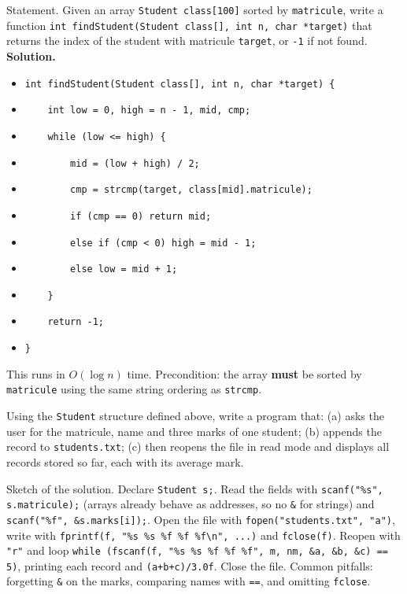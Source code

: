 \documentclass[11pt]{article}
\begin{document}
\begin{exoresolu}
Statement. Given an array \texttt{Student class[100]} sorted by \texttt{matricule}, write a function \texttt{int findStudent(Student class[], int n, char *target)} that returns the index of the student with matricule \texttt{target}, or \texttt{-1} if not found.
\tcblower
\textbf{Solution.}
\begin{itemize}
\item \texttt{int findStudent(Student class[], int n, char *target) \{}
\item \texttt{~~~~int low = 0, high = n - 1, mid, cmp;}
\item \texttt{~~~~while (low <= high) \{}
\item \texttt{~~~~~~~~mid = (low + high) / 2;}
\item \texttt{~~~~~~~~cmp = strcmp(target, class[mid].matricule);}
\item \texttt{~~~~~~~~if (cmp == 0) return mid;}
\item \texttt{~~~~~~~~else if (cmp < 0) high = mid - 1;}
\item \texttt{~~~~~~~~else low = mid + 1;}
\item \texttt{~~~~\}}
\item \texttt{~~~~return -1;}
\item \texttt{\}}
\end{itemize}
This runs in $O(\log n)$ time. Precondition: the array \textbf{must} be sorted by \texttt{matricule} using the same string ordering as \texttt{strcmp}.
\end{exoresolu}

\begin{exercice}
Using the \texttt{Student} structure defined above, write a program that: (a) asks the user for the matricule, name and three marks of one student; (b) appends the record to \texttt{students.txt}; (c) then reopens the file in read mode and displays all records stored so far, each with its average mark.
\end{exercice}

\begin{corrige}[Exercise 1]
Sketch of the solution. Declare \texttt{Student s;}. Read the fields with \texttt{scanf("\%s", s.matricule);} (arrays already behave as addresses, so no \texttt{\&} for strings) and \texttt{scanf("\%f", \&s.marks[i]);}. Open the file with \texttt{fopen("students.txt", "a")}, write with \texttt{fprintf(f, "\%s \%s \%f \%f \%f\textbackslash n", ...)} and \texttt{fclose(f)}. Reopen with \texttt{"r"} and loop \texttt{while (fscanf(f, "\%s \%s \%f \%f \%f", m, nm, \&a, \&b, \&c) == 5)}, printing each record and \texttt{(a+b+c)/3.0f}. Close the file. Common pitfalls: forgetting \texttt{\&} on the marks, comparing names with \texttt{==}, and omitting \texttt{fclose}.
\end{corrige}
\end{document}
